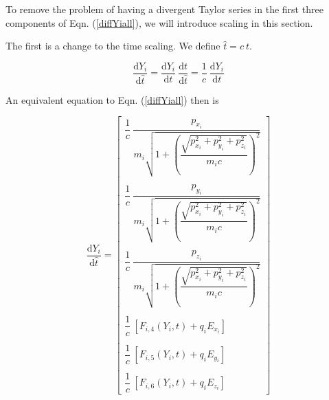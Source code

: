 \documentclass[oneside,12pt]{book}
\begin{document}
To remove the problem of having a divergent Taylor series in the first three components of Eqn. (\ref{diffYiall}), we will introduce scaling in this section.  

The first is a change to the time scaling. We define $\hat{t}=c \ t$.  

\[\dfrac{\text{d}{Y_i}}{\text{d}\hat{t}}=\dfrac{\text{d}{Y_i}}{\text{d}t} \ \dfrac{\text{d}t}{\text{d} \hat{t}} = \dfrac{1}{c} \ \dfrac{\text{d}{Y_i}}{\text{d}t} \]

An equivalent equation to Eqn. (\ref{diffYiall}) then is 

\begin{equation}
\dfrac{\text{d}{Y_i}}{\text{d}\hat{t}}=\left[
\begin{array}{c}
\dfrac{1}{c} \ \dfrac{p_{x_i}}{m_i \sqrt{1+\left(\dfrac{\sqrt{p_{x_i}^2 + p_{y_i}^2 + p_{z_i}^2}}{m_i c}\right)^2}}
\\
\\
\dfrac{1}{c} \ \dfrac{p_{y_i}}{m_i \sqrt{1+\left(
 \dfrac{\sqrt{p_{x_i}^2 + p_{y_i}^2 + p_{z_i}^2}}{m_i c}\right)^2}}
\\
\\
\dfrac{1}{c} \ \dfrac{p_{z_i}}{m_i \sqrt{1+\left(
 \dfrac{\sqrt{p_{x_i}^2 + p_{y_i}^2 + p_{z_i}^2}}{m_i c}\right)^2}} 
\\
\\
\dfrac{1}{c} \ \left[ F_{i,4} (Y_i,t)+q_i E_{x_i} \right]
\\
\\
\dfrac{1}{c} \ \left[ F_{i,5} (Y_i,t)+q_i E_{y_i} \right]
\\
\\
\dfrac{1}{c} \ \left[ F_{i,6} (Y_i,t)+q_i E_{z_i} \right]
\end{array}
\right]
\label{diffYalltimec}
\end{equation}
\end{document}

